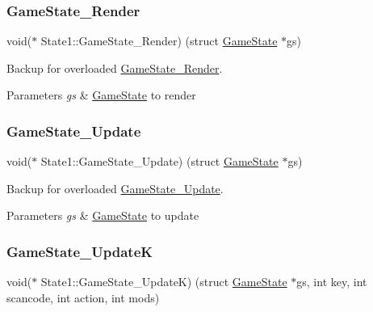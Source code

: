 \subsubsection{\texorpdfstring{GameState\_Render}{GameState\_Render}}
{\footnotesize\ttfamily void($\ast$ State1\+::\+Game\+State\+\_\+\+Render) (struct \mbox{\hyperlink{struct_game_state}{Game\+State}} $\ast$gs)}



Backup for overloaded \mbox{\hyperlink{struct_state1_a37f8f5351b463bde341c3f485fea341e}{Game\+State\+\_\+\+Render}}. 


\begin{DoxyParams}{Parameters}
{\em gs} & \mbox{\hyperlink{struct_game_state}{Game\+State}} to render \\
\hline
\end{DoxyParams}
\mbox{\label{struct_state1_a51c43350ef6647802c8b36dfca624ce4}} 
\subsubsection{\texorpdfstring{GameState\_Update}{GameState\_Update}}
{\footnotesize\ttfamily void($\ast$ State1\+::\+Game\+State\+\_\+\+Update) (struct \mbox{\hyperlink{struct_game_state}{Game\+State}} $\ast$gs)}



Backup for overloaded \mbox{\hyperlink{struct_state1_a51c43350ef6647802c8b36dfca624ce4}{Game\+State\+\_\+\+Update}}. 


\begin{DoxyParams}{Parameters}
{\em gs} & \mbox{\hyperlink{struct_game_state}{Game\+State}} to update \\
\hline
\end{DoxyParams}
\mbox{\label{struct_state1_a89cc02d16a6cc4ec9c908ad4a5176533}} 
\subsubsection{\texorpdfstring{GameState\_UpdateK}{GameState\_UpdateK}}
{\footnotesize\ttfamily void($\ast$ State1\+::\+Game\+State\+\_\+\+UpdateK) (struct \mbox{\hyperlink{struct_game_state}{Game\+State}} $\ast$gs, int key, int scancode, int action, int mods)}



